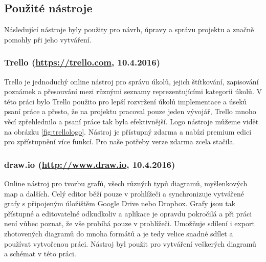 \documentclass[czech,master,public,dept460,male,java,cpdeclaration]{diploma}
\begin{document}






\subsection{Použité nástroje}
Následující nástroje byly použity pro návrh, úpravy a správu projektu a značně pomohly při jeho vytváření.
\subsubsection{Trello (\url{https://trello.com}, 10.4.2016)}
Trello je jednoduchý online nástroj pro správu úkolů, jejich štítkování, zapisování poznámek a přesouvání
mezi různými seznamy reprezentujícími kategorii úkolů. V této práci bylo Trello použito pro lepší
rozvržení úkolů implementace a úseků psaní práce a přesto, že na projektu pracoval pouze jeden vývojář,
Trello mnoho věcí zpřehlednilo a psaní práce tak byla efektivnější. Logo nástroje můžeme vidět
na obrázku \ref{fig:trellologo}. Nástroj je přístupný zdarma a nabízí premium edici pro zpřístupnění
více funkcí. Pro naše potřeby verze zdarma zcela stačila.

\subsubsection{draw.io (\url{http://www.draw.io}, 10.4.2016)}
Online nástroj pro tvorbu grafů, všech různých typů diagramů, myšlenkových map a dalších.
Celý editor běží pouze v prohlížeči a synchronizuje vytvářené grafy s připojeným úložištěm
Google Drive nebo Dropbox. Grafy jsou tak přístupné  a editovatelné odkudkoliv a aplikace
je opravdu pokročilá a při práci není vůbec poznat, že vše probíhá pouze v prohlížeči.
Umožňuje sdílení i export zhotovených diagramů do mnoha formátů a je tedy velice snadné
sdílet a používat vytvořenou práci.
Nástroj byl použit pro vytváření veškerých diagramů a schémat v této práci.
\end{document}
